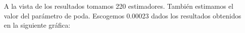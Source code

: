 \documentclass[a4]{article}
\begin{document}
\begin{figure}[H]
  \centering
\end{figure}

A la vista de los resultados tomamos 220 estimadores. También estimamos el valor del parámetro de poda. Escogemos 0.00023 dados los resultados obtenidos en la siguiente gráfica:

\begin{figure}[H]
  \centering
\end{figure}
\end{document}
